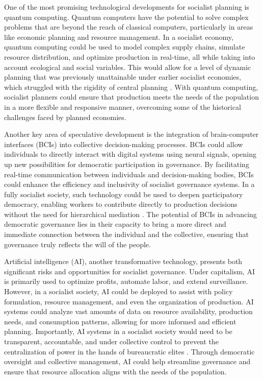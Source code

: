\begin{refsection}
One of the most promising technological developments for socialist planning is quantum computing. Quantum computers have the potential to solve complex problems that are beyond the reach of classical computers, particularly in areas like economic planning and resource management. In a socialist economy, quantum computing could be used to model complex supply chains, simulate resource distribution, and optimize production in real-time, all while taking into account ecological and social variables. This would allow for a level of dynamic planning that was previously unattainable under earlier socialist economies, which struggled with the rigidity of central planning \cite[pp.~115-120]{nielsen_quantum_computing}. With quantum computing, socialist planners could ensure that production meets the needs of the population in a more flexible and responsive manner, overcoming some of the historical challenges faced by planned economies.

Another key area of speculative development is the integration of brain-computer interfaces (BCIs) into collective decision-making processes. BCIs could allow individuals to directly interact with digital systems using neural signals, opening up new possibilities for democratic participation in governance. By facilitating real-time communication between individuals and decision-making bodies, BCIs could enhance the efficiency and inclusivity of socialist governance systems. In a fully socialist society, such technology could be used to deepen participatory democracy, enabling workers to contribute directly to production decisions without the need for hierarchical mediation \cite[pp.~202-207]{walter_bci_2022}. The potential of BCIs in advancing democratic governance lies in their capacity to bring a more direct and immediate connection between the individual and the collective, ensuring that governance truly reflects the will of the people.

Artificial intelligence (AI), another transformative technology, presents both significant risks and opportunities for socialist governance. Under capitalism, AI is primarily used to optimize profits, automate labor, and extend surveillance. However, in a socialist society, AI could be deployed to assist with policy formulation, resource management, and even the organization of production. AI systems could analyze vast amounts of data on resource availability, production needs, and consumption patterns, allowing for more informed and efficient planning. Importantly, AI systems in a socialist society would need to be transparent, accountable, and under collective control to prevent the centralization of power in the hands of bureaucratic elites \cite[pp.~44-49]{benjamin_race_after_tech}. Through democratic oversight and collective management, AI could help streamline governance and ensure that resource allocation aligns with the needs of the population.


\end{refsection}
